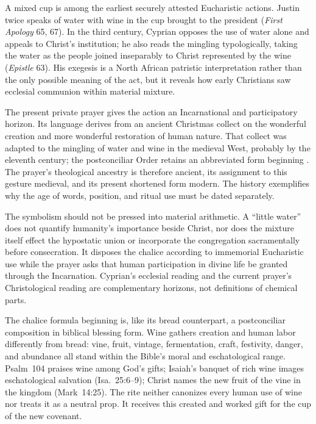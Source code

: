 A mixed cup is among the earliest securely attested Eucharistic actions. Justin twice speaks of water with wine in the cup brought to the president (\emph{First Apology} 65, 67). In the third century, Cyprian opposes the use of water alone and appeals to Christ's institution; he also reads the mingling typologically, taking the water as the people joined inseparably to Christ represented by the wine (\emph{Epistle} 63). His exegesis is a North African patristic interpretation rather than the only possible meaning of the act, but it reveals how early Christians saw ecclesial communion within material mixture.

The present private prayer gives the action an Incarnational and participatory horizon. Its language derives from an ancient Christmas collect on the wonderful creation and more wonderful restoration of human nature. That collect was adapted to the mingling of water and wine in the medieval West, probably by the eleventh century; the postconciliar Order retains an abbreviated form beginning . The prayer's theological ancestry is therefore ancient, its assignment to this gesture medieval, and its present shortened form modern. The history exemplifies why the age of words, position, and ritual use must be dated separately.

The symbolism should not be pressed into material arithmetic. A ``little water'' does not quantify humanity's importance beside Christ, nor does the mixture itself effect the hypostatic union or incorporate the congregation sacramentally before consecration. It disposes the chalice according to immemorial Eucharistic use while the prayer asks that human participation in divine life be granted through the Incarnation. Cyprian's ecclesial reading and the current prayer's Christological reading are complementary horizons, not definitions of chemical parts.

The chalice formula beginning  is, like its bread counterpart, a postconciliar composition in biblical blessing form. Wine gathers creation and human labor differently from bread: vine, fruit, vintage, fermentation, craft, festivity, danger, and abundance all stand within the Bible's moral and eschatological range. Psalm~104 praises wine among God's gifts; Isaiah's banquet of rich wine images eschatological salvation (Isa.~25:6--9); Christ names the new fruit of the vine in the kingdom (Mark~14:25). The rite neither canonizes every human use of wine nor treats it as a neutral prop. It receives this created and worked gift for the cup of the new covenant.

